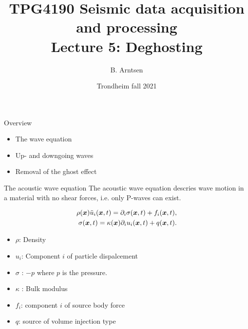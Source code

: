 \documentclass[xcolor=dvipsnames,notes]{beamer}
\begin{document}
\title{TPG4190 Seismic data acquisition and processing \\
               Lecture 5: Deghosting}
\author{B. Arntsen}
\date{Trondheim fall 2021}
\begin{frame}
 \titlepage
\end{frame}
\begin{frame}{Overview}
\begin{itemize}
  \item The wave equation
  \item Up- and downgoing waves
  \item Removal of the ghost effect
  \end{itemize}
\end{frame}
\begin{frame}{The acoustic wave equation}
The acoustic wave equation descries wave motion in
a material with no shear forces, i.e. only P-waves
can exist.

\begin{eqnarray}
\rho(\mbox{\boldmath $x$}) \ddot{u}_i(\mbox{\boldmath $x$},t) = \partial_i \sigma(\mbox{\boldmath $x$},t) + f_i(\mbox{\boldmath $x$},t) ,\\
                                                     \label{eq:newton}
\sigma(\mbox{\boldmath $x$},t) = \kappa(\mbox{\boldmath $x$}) \partial_i u_i(\mbox{\boldmath $x$},t) + q(\mbox{\boldmath $x$},t).
                                                     \label{eq:hook}
\end{eqnarray}

\begin{itemize}
  \item $\rho$: Density
  \item $u_i$: Component $i$ of particle dispalcement
  \item $\sigma$ : $-p$ where $p$ is the pressure.
  \item $\kappa$ : Bulk modulus
  \item $f_i$: component $i$ of source body force
  \item $q$: source of volume injection type
\end{itemize}
\end{frame}
\end{document}

